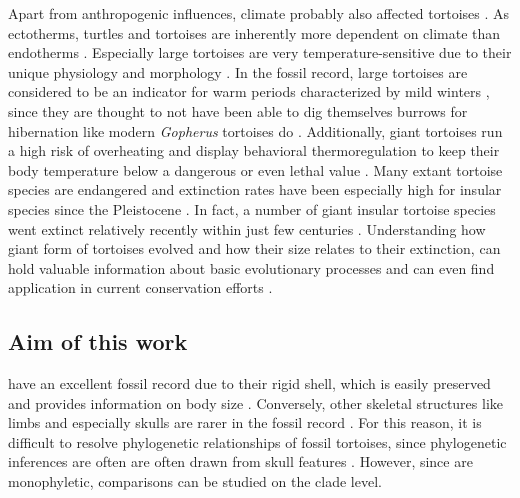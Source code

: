 Apart from anthropogenic influences, climate probably also affected tortoises \citep{VanderSluis2014}. 
As ectotherms, turtles and tortoises are inherently more dependent on climate than endotherms \citep{Delfino2003}. Especially large tortoises are very temperature-sensitive due to their unique physiology and morphology \citep{Swingland1979a, Swingland1979}. In the fossil record, large tortoises are considered to be an indicator for warm periods characterized by mild winters \citep{Hibbard1960,Schleich1981}, since they are thought to not have been able to dig themselves burrows for hibernation like modern \textit{Gopherus} tortoises do %
\citep{Carlson1999, Stoyanov2009}. Additionally, giant tortoises run a high risk of overheating and display behavioral thermoregulation to keep their body temperature below a dangerous or even lethal value \citep{Sturbaum1982, Schleich1981}.
Many extant tortoise species are endangered and extinction rates have been especially high for insular species since the Pleistocene \citep{Rhodin2015}.
In fact, a number of giant insular tortoise species went extinct relatively recently within just few centuries \citep{Rhodin2015}.
Understanding how giant form of tortoises evolved and how their size relates to their extinction, can hold valuable information about basic evolutionary processes and can even find application in current conservation efforts \citep{Hansen2010}.




 

\subsection{Aim of this work}

\T have an excellent fossil record due to their rigid shell, which is easily preserved and provides information on body size \citep{Lujan2014}. Conversely, other skeletal structures like limbs and especially skulls are rarer in the fossil record \citep{Lujan2014}.
For this reason, it is difficult to resolve phylogenetic relationships of fossil tortoises, since phylogenetic inferences are often are often drawn from skull features \citep{Lujan2014,DeLapparentdeBroin2000,DeLapparentdeBroin2001}. However, since \T are monophyletic, comparisons can be studied on the clade level.


